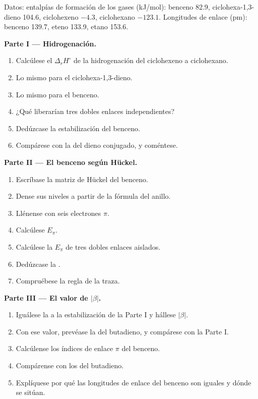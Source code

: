 \begin{problem}
\label{pb:b2:huckel:1}
Datos: entalpías de formación de los gases (\unit{kJ/mol}): benceno 82.9,
ciclohexa-1,3-dieno 104.6, ciclohexeno $-4.3$, ciclohexano $-123.1$. Longitudes de enlace
(pm): benceno 139.7, eteno 133.9, etano 153.6.

\medskip
\noindent\textbf{Parte I --- Hidrogenación.}
\begin{enumerate}
  \item Calcúlese el $\Delta_r H^\circ$ de la hidrogenación del ciclohexeno a ciclohexano.
  \item Lo mismo para el ciclohexa-1,3-dieno.
  \item Lo mismo para el benceno.
  \item ¿Qué liberarían tres dobles enlaces independientes?
  \item Dedúzcase la estabilización del benceno.
  \item Compárese con la del dieno conjugado, y coméntese.
\end{enumerate}

\medskip
\noindent\textbf{Parte II --- El benceno según Hückel.}
\begin{enumerate}[resume]
  \item Escríbase la matriz de Hückel del benceno.
  \item Dense sus niveles a partir de la fórmula del anillo.
  \item Llénense con seis electrones $\pi$.
  \item Calcúlese $E_\pi$.
  \item Calcúlese la $E_\pi$ de tres dobles enlaces aislados.
  \item Dedúzcase la .
  \item Compruébese la regla de la traza.
\end{enumerate}

\medskip
\noindent\textbf{Parte III --- El valor de $|\beta|$.}
\begin{enumerate}[resume]
  \item Iguálese la  a la estabilización de la Parte I y hállese
        $|\beta|$.
  \item Con ese valor, prevéase la  del butadieno, y compárese
        con la Parte I.
  \item Calcúlense los índices de enlace $\pi$ del benceno.
  \item Compárense con los del butadieno.
  \item Explíquese por qué las longitudes de enlace del benceno son iguales y dónde se sitúan.
\end{enumerate}


\end{problem}
